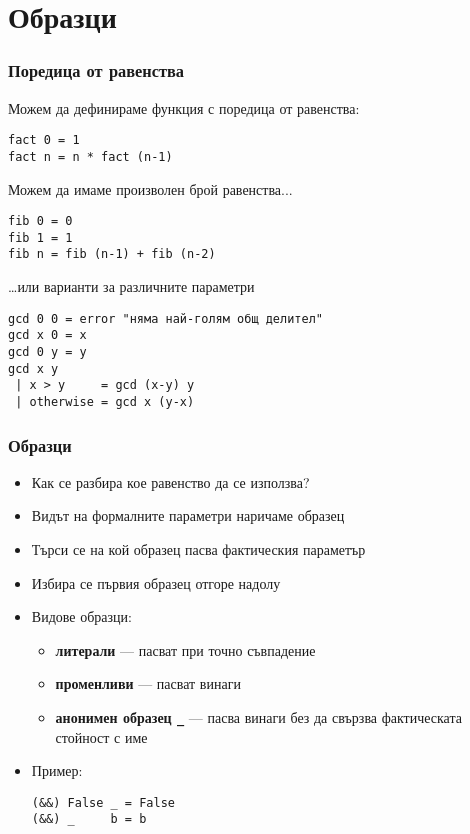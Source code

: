 \documentclass{beamer}
\begin{document}
\section{Образци}

\begin{frame}[fragile]
  \frametitle{Поредица от равенства}
  Можем да дефинираме функция с поредица от равенства:
\begin{verbatim}
fact 0 = 1
fact n = n * fact (n-1)
\end{verbatim}
  \pause
  Можем да имаме произволен брой равенства...
\begin{verbatim}
fib 0 = 0
fib 1 = 1
fib n = fib (n-1) + fib (n-2)
\end{verbatim}
  \pause
  \ldots или варианти за различните параметри
\begin{verbatim}
gcd 0 0 = error "няма най-голям общ делител"
gcd x 0 = x
gcd 0 y = y
gcd x y
 | x > y     = gcd (x-y) y
 | otherwise = gcd x (y-x)
\end{verbatim}
\end{frame}

\begin{frame}[fragile]
  \frametitle{Образци}
  \begin{itemize}[<+->]
  \item Как се разбира кое равенство да се използва?
  \item Видът на формалните параметри наричаме \alert{образец}
  \item Търси се на кой образец пасва фактическия параметър
  \item Избира се първия образец \alert{отгоре надолу}
  \item Видове образци:
    \begin{itemize}
    \item \textbf{литерали} --- пасват при точно съвпадение
    \item \textbf{променливи} --- пасват винаги
    \item \textbf{анонимен образец \tt\_} ---  пасва винаги без да свързва фактическата стойност с име
    \end{itemize}
  \item Пример:
\begin{verbatim}
(&&) False _ = False
(&&) _     b = b
\end{verbatim}
  \end{itemize}
\end{frame}
\end{document}
